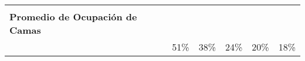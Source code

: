 \begin{tabular}{l|ccccc|}
	\textbf{} &
	\multicolumn{1}{c|}{\cellcolor[HTML]{FCE4D6}} &
	\multicolumn{1}{c|}{\cellcolor[HTML]{EDEDED}} &
	\multicolumn{1}{c|}{\cellcolor[HTML]{DDEBF7}} &
	\multicolumn{1}{c|}{\cellcolor[HTML]{E2EFDA}} &
	\cellcolor[HTML]{FFF2CC} \\
	\textbf{Promedio de Ocupación de Camas} &
	\multicolumn{1}{c|}{\cellcolor[HTML]{FCE4D6}} &
	\multicolumn{1}{c|}{\cellcolor[HTML]{EDEDED}} &
	\multicolumn{1}{c|}{\cellcolor[HTML]{DDEBF7}} &
	\multicolumn{1}{c|}{\cellcolor[HTML]{E2EFDA}} &
	\cellcolor[HTML]{FFF2CC} \\
	&
	\multicolumn{1}{c|}{\multirow{-3}{*}{\cellcolor[HTML]{FCE4D6}51\%}} &
	\multicolumn{1}{c|}{\multirow{-3}{*}{\cellcolor[HTML]{EDEDED}38\%}} &
	\multicolumn{1}{c|}{\multirow{-3}{*}{\cellcolor[HTML]{DDEBF7}24\%}} &
	\multicolumn{1}{c|}{\multirow{-3}{*}{\cellcolor[HTML]{E2EFDA}20\%}} &
	\multirow{-3}{*}{\cellcolor[HTML]{FFF2CC}18\%} \\ \hline
\end{tabular}